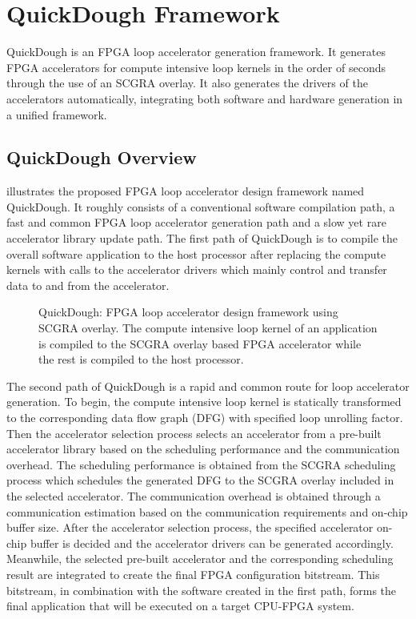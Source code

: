 \section{QuickDough Framework}\label{sec:framework}
QuickDough is an FPGA loop accelerator generation framework. It generates FPGA accelerators for
compute intensive loop kernels in the order of seconds through the use of an SCGRA overlay. It also
generates the drivers of the accelerators automatically, integrating both software and hardware
generation in a unified framework.

\subsection{QuickDough Overview}
 illustrates the proposed FPGA loop accelerator design framework named QuickDough.
It roughly consists of a conventional software compilation path, a fast and common FPGA loop accelerator
generation path and a slow yet rare accelerator library update path. The first path of QuickDough is to compile
the overall software application to the host processor after replacing the compute kernels with
calls to the accelerator drivers which mainly control and transfer data to and from the accelerator. 

\begin{figure}[bt]
    \caption{QuickDough: FPGA loop accelerator design framework using 
        SCGRA overlay. The compute intensive loop kernel of an 
        application is compiled to the SCGRA overlay based FPGA
    accelerator while the rest is compiled to the host processor.}
    \label{fig:framework}
\end{figure}

The second path of QuickDough is a rapid and common route for loop accelerator generation. To begin,
the compute intensive loop kernel is statically transformed to the corresponding data flow graph
(DFG) with specified loop unrolling factor. Then the accelerator selection process selects an
accelerator from a pre-built accelerator library based on the scheduling performance and the
communication overhead. The scheduling performance is obtained from the SCGRA scheduling
process which schedules the generated DFG to the SCGRA overlay included in the selected accelerator.
The communication overhead is obtained through a communication estimation based on
the communication requirements and on-chip buffer size. After the accelerator selection
process, the specified accelerator on-chip buffer is decided and the accelerator drivers can be
generated accordingly. Meanwhile, the selected pre-built accelerator and the corresponding
scheduling result are integrated to create the final FPGA configuration bitstream. This bitstream, in
combination with the software created in the first path, forms the final application that will be
executed on a target CPU-FPGA system.

